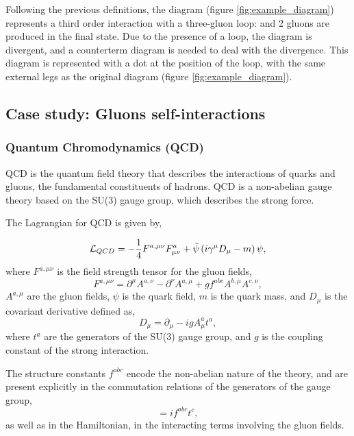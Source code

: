 \documentclass[11pt,a4paper,twoside,pdf]{article}
\numberwithin{equation}{section}
\begin{document}
Following the previous definitions, the diagram (figure \ref{fig:example_diagram}) represents
a third order interaction with a three-gluon loop: and 2 gluons are 
produced in the final state. Due to the presence of a loop, the diagram is
divergent, and a counterterm diagram is needed to deal with the divergence. This 
diagram is represented with a dot at the position of the loop, with the same 
external legs as the original diagram (figure \ref{fig:example_diagram}). 

\newpage
\subsection{Case study: Gluons self-interactions} \label{sec:cases}

\subsubsection{Quantum Chromodynamics (QCD)}
QCD is the quantum field theory that describes the
interactions of quarks and gluons, the fundamental constituents of hadrons.
QCD is a non-abelian gauge theory based on the SU(3) gauge group, which describes
the strong force.

The Lagrangian for QCD is given by,

\begin{equation}
    \mathcal{L}_{QCD} = -\frac{1}{4} F^{a,\mu\nu} F^a_{\mu\nu} + \bar{\psi}
    \left( i\gamma^\mu D_\mu - m \right) \psi,
\label{eq:qcd_lagrangian}
\end{equation}
where \( F^{a,\mu\nu} \) is the field strength tensor for the gluon fields,
\begin{equation}
    F^{a,\mu\nu} = \partial^\mu A^{a,\nu} - \partial^\nu A^{a,\mu} + g f^{abc} A^{b,\mu} A^{c,\nu},
\end{equation}
\( A^{a,\mu} \) are the gluon fields, \( \psi \) is the quark field, \( m \) is the quark mass,
and \( D_\mu \) is the covariant derivative defined as,
\begin{equation}
    D_\mu = \partial_\mu - ig A^a_\mu t^a,
\end{equation}
where \( t^a \) are the generators of the SU(3) gauge group, and \( g \) is the
coupling constant of the strong interaction.

The structure constants \( f^{abc} \) encode the non-abelian nature of the
theory, and are present explicitly in the commutation relations of the
generators of the gauge group,
\begin{equation}
    [t^a, t^b] = i f^{abc} t^c,
\end{equation}
as well as in the Hamiltonian, in the interacting terms involving the gluon fields.
\end{document}
